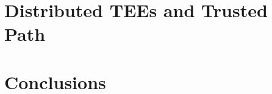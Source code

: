 \documentclass[%
    twoside, openright, titlepage, numbers=noenddot,%
    cleardoublepage=empty,%
    abstractoff,%
    BCOR=5.5mm, paper=a5, fontsize=10pt,%
]{scrreprt}
\begin{document}
\cleardoublepage

\part{Distributed TEEs and Trusted Path}
\def\dir{chapters/PIE}



\cleardoublepage

\part{Conclusions}
\def\dir{chapters/conclusion_outlook}


%

\cleardoublepage


\cleardoublepage
\end{document}

